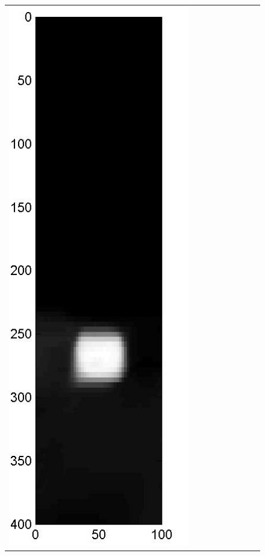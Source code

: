 \documentclass[11pt]{article}
\begin{document}
{\begin{figure}[!h]
\begin{center}
\begin{tabular}{|c|c|c|c|c|c|c|c|c|}
			\includegraphics[width=.9\iwidth]{figures/newFigs/noisy/resultsExp-6-mkTV}
			&

\end{tabular}
\end{center}
\end{figure}}
\end{document}
